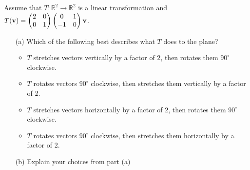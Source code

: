 \begin{problem}
    Assume that $T: \mathbb{R}^2 \to \mathbb{R}^2$ is a linear transformation and $T({\bf v})
    = \begin{pmatrix} 2&0\\0&1\end{pmatrix}\begin{pmatrix}0&1\\-1&0\end{pmatrix} {\bf v}$.
    \begin{enumerate}
        \item[(a)] Which of the following best describes what $T$ does to the plane?
            \begin{itemize}
                \item $T$ stretches vectors vertically by a factor of 2, then rotates them
                    $90^\circ$ clockwise.
                \item $T$ rotates vectors $90^\circ$ clockwise, then stretches them
                    vertically by a factor of 2.
                \item $T$ stretches vectors horizontally by a factor of 2, then rotates them
                    $90^\circ$ clockwise.
                \item $T$ rotates vectors $90^\circ$ clockwise, then stretches them
                    horizontally by a factor of 2.
            \end{itemize}
        \item[(b)] Explain your choices from part (a)
    \end{enumerate}
\end{problem}

